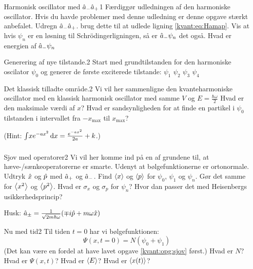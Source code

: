 
\begin{opgave}{Harmonisk oscillator med $\hat a_- \hat a_+$}{1}
\label{kvant:opg:amap}
Færdiggør udledningen af den harmoniske oscillator. Hvis du havde problemer med denne udledning er denne opgave stærkt anbefalet.
\opg Udregn $\hat a_-\hat a_+$.
\opg brug dette til at udlede ligning \eqref{kvant:eq:Hamap}.
\opg Vis at hvis $\psi_n$ er en løsning til Schrödingerligningen, så er $\hat a_-\psi_n$ det også.
\opg Hvad er energien af $\hat a_- \psi_n$
\end{opgave}

\begin{opgave}{Generering af nye tilstande.}{2}
Start med grundtilstanden for den harmoniske oscilator $\psi_0$ og generer de første exciterede tilstande:
\opg $\psi_1$
\opg $\psi_2$
\opg $\psi_3$
\opg $\psi_4$
\end{opgave}

\begin{opgave}{Det klassisk tilladte område.}{2}
Vi vil her sammenligne den kvanteharmoniske oscillator med en klassisk harmonisk oscillator med samme $V$ og $E=\frac{\hbar\omega}{2}$
\opg Hvad er den maksimale værdi af $x$?
\opg
Hvad er sandsynligheden for at finde en partikel i $\psi_0$ tilstanden i intervallet fra $-x_\text{max}$ til $x_\text{max}$?

(Hint: $\int\limits_{}^{} \! xe^{-ax^2} \, \textrm{d}x = \frac{e^{-ax^2}}{2a}+k$.)
\end{opgave}

\begin{opgave}{Sjov med operatorer}{2}
\label{kvant:opg:sjov}
Vi vil her komme ind på en af grundene til, at hæve-/sænkeoperatorerne er smarte. Udenyt at bølgefunktionerne er ortonormale.
\opg Udtryk $\hat x$ og $\hat p$ med $\hat a_+$ og $\hat a_-$.
\opg Find $\left< x \right>$ og $\left< p \right>$ for $\psi_0$, $\psi_1$ og $\psi_{n}$.
\opg Gør det samme for $\left< x^2 \right>$ og $\left< p^2 \right>$.
\opg Hvad er $\sigma_x$ og $\sigma_p$ for $\psi_n$?
\opg Hvor dan passer det med Heisenbergs usikkerhedsprincip?

Husk: $\hat a_\pm = \frac{1}{\sqrt{2 m \hbar\omega}}(\mp i\hat p+m\omega \hat x)$
\end{opgave}

\begin{opgave}{Nu med tid}{2}
Til tiden $t=0$ har vi bølgefunktionen: $$\Psi(x,t=0) = N(\psi_0+\psi_1)$$ (Det kan være en fordel at have lavet opgave \ref{kvant:opg:sjov} først.)
\opg Hvad er $N$?
\opg Hvad er $\Psi(x,t)$?
\opg Hvad er $\left< E \right>$?
\opg Hvad er $\left< x(t) \right>$?
\end{opgave}